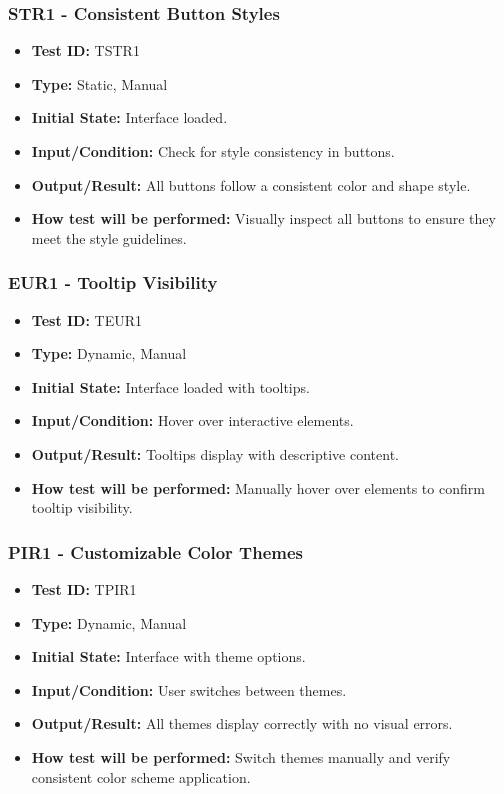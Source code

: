 \documentclass[12pt, titlepage]{article}
\begin{document}
\subsubsection{STR1 - Consistent Button Styles}
\begin{itemize}
    \item \textbf{Test ID:} TSTR1
    \item \textbf{Type:} Static, Manual
    \item \textbf{Initial State:} Interface loaded.
    \item \textbf{Input/Condition:} Check for style consistency in buttons.
    \item \textbf{Output/Result:} All buttons follow a consistent color and shape style.
    \item \textbf{How test will be performed:} Visually inspect all buttons to ensure they meet the style guidelines.
\end{itemize}

\subsubsection{EUR1 - Tooltip Visibility}
\begin{itemize}
    \item \textbf{Test ID:} TEUR1
    \item \textbf{Type:} Dynamic, Manual
    \item \textbf{Initial State:} Interface loaded with tooltips.
    \item \textbf{Input/Condition:} Hover over interactive elements.
    \item \textbf{Output/Result:} Tooltips display with descriptive content.
    \item \textbf{How test will be performed:} Manually hover over elements to confirm tooltip visibility.
\end{itemize}

\subsubsection{PIR1 - Customizable Color Themes}
\begin{itemize}
    \item \textbf{Test ID:} TPIR1
    \item \textbf{Type:} Dynamic, Manual
    \item \textbf{Initial State:} Interface with theme options.
    \item \textbf{Input/Condition:} User switches between themes.
    \item \textbf{Output/Result:} All themes display correctly with no visual errors.
    \item \textbf{How test will be performed:} Switch themes manually and verify consistent color scheme application.
\end{itemize}
\end{document}
